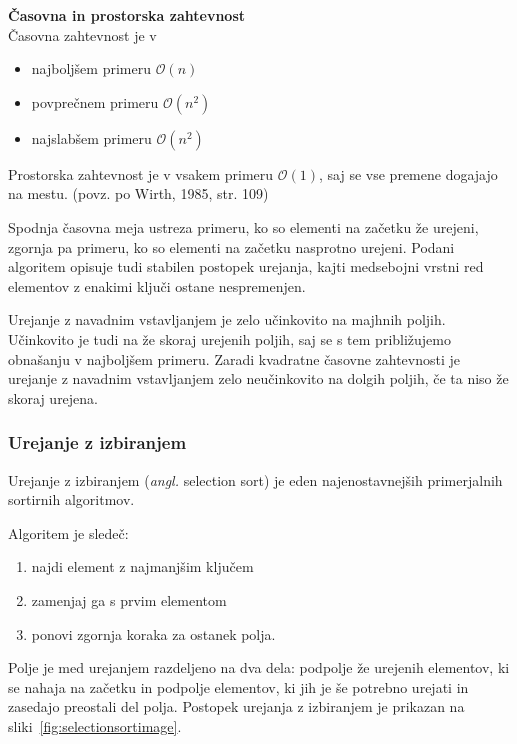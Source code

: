 \documentclass[a4paper,oneside,12pt]{article}
\newcommand{\subsubsubsection}[1]{\vspace*{1ex}\textbf{#1}\\}
\begin{document}
\subsubsubsection{Časovna in prostorska zahtevnost} \nopagebreak
Časovna zahtevnost je v 
\begin{itemize}
  \item najboljšem primeru $\mathcal{O}(n)$
  \item povprečnem primeru $\mathcal{O}(n^2)$
  \item najslabšem primeru $\mathcal{O}(n^2)$
\end{itemize}

Prostorska zahtevnost je v vsakem primeru $\mathcal{O}(1)$, saj se vse premene dogajajo na
mestu.
(povz. po Wirth, 1985, str. 109)

Spodnja časovna meja ustreza primeru, ko so elementi na začetku že urejeni, zgornja pa primeru,
ko so elementi na začetku nasprotno urejeni. Podani algoritem opisuje tudi stabilen postopek urejanja, kajti medsebojni
vrstni red elementov z enakimi ključi ostane nespremenjen.

Urejanje z navadnim vstavljanjem je zelo učinkovito na majhnih poljih. Učinkovito je tudi na že
skoraj urejenih poljih, saj se s tem približujemo obnašanju v najboljšem primeru.
Zaradi kvadratne časovne zahtevnosti je urejanje z navadnim vstavljanjem zelo neučinkovito na
dolgih poljih, če ta niso že skoraj urejena.

\subsubsection{Urejanje z izbiranjem}
\label{chapter:selectionsort}
Urejanje z izbiranjem (\emph{angl.} selection sort) je eden najenostavnejših primerjalnih sortirnih
algoritmov.

Algoritem je sledeč:\vspace{-1ex}
\begin{enumerate}\addtolength{\itemsep}{-0.65\baselineskip}
  \item najdi element z najmanjšim ključem
  \item zamenjaj ga s prvim elementom
  \item ponovi zgornja koraka za ostanek polja.
\end{enumerate}

Polje je med urejanjem razdeljeno na dva dela: podpolje že urejenih elementov, ki se
nahaja na začetku in podpolje elementov, ki jih je še potrebno urejati in zasedajo
preostali del polja. Postopek urejanja z izbiranjem je prikazan na
sliki~\ref{fig:selectionsortimage}. \\
\end{document}
